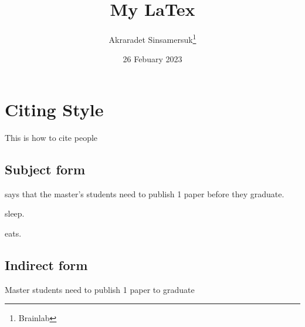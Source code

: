 \documentclass{article}
\title{My LaTex}
\author{Akraradet Sinsamersuk\thanks{Brainlab}}
\date{26 Febuary 2023}
\begin{document}
\maketitle
\newpage

\tableofcontents
\newpage






\section{Citing Style}

This is how to cite people

\subsection{Subject form}

\textcite{chaky} says that the master's students need to publish 1 paper before they graduate.

\textcite{2author} sleep.

\textcite{3author} eats.

\subsection{Indirect form}

Master students need to publish 1 paper to graduate \cite{chaky}


\cite{vaswani2017attention}

\printbibliography %
\end{document}
